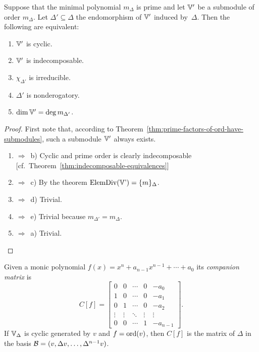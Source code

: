 \begin{cor}
    Suppose that the minimal polynomial\/ $m_\Delta$ is prime and let\/ $\mathbb V'$ be a submodule of order\/ $m_\Delta$. Let\/ $\Delta'\subseteq\Delta$ the endomorphism of\/ $\mathbb V'$ induced by\/~$\Delta$. Then the following are equivalent:
    \begin{enumerate}[\rm a)]
        \item $\mathbb V'$ is cyclic.  
        \item $\mathbb V'$ is indecomposable.  
        \item $\chi_{\Delta'}$ is irreducible.  
        \item $\Delta'$ is nonderogatory.
        \item $\dim\mathbb V' = \deg m_{\Delta'}$.
    \end{enumerate}
\end{cor}

\begin{proof}First note that, according to Theorem~\ref{thm:prime-factors-of-ord-have-submodules}, such a submodule $\mathbb V'$ always exists.
    \begin{enumerate}[\rm a)]
        \item $\Rightarrow$~b) Cyclic and prime order is clearly indecomposable [cf.~Theorem~\ref{thm:indecomposable-equivalences}]

        \item $\Rightarrow$~c) By the theorem $\operatorname{ElemDiv(\mathbb V')}=\{m\}_\Delta$.

        \item $\Rightarrow$~d) Trivial.

        \item $\Rightarrow$~e) Trivial because $m_{\Delta'}=m_\Delta$.

        \item $\Rightarrow$~a) Trivial.
    \end{enumerate}
\end{proof}

\begin{defn}\label{defn:companion-matrix}
    Given a monic polynomial $f(x)=x^n+a_{n-1}x^{n-1}+\cdots+a_0$ its \textsl{companion matrix} is
    $$
        C[f] = 
        \begin{bmatrix}
        0 & 0 & \cdots & 0 & -a_0 \\
        1 & 0 & \cdots & 0 & -a_1 \\
        0 & 1 & \cdots & 0 & -a_2 \\
        \vdots & \vdots & \ddots & \vdots & \vdots \\
        0 & 0 & \cdots & 1 & -a_{n-1}
        \end{bmatrix}.
    $$
    If $\mathbb V_\Delta$ is cyclic generated by $v$ and $f=\operatorname{ord}(v)$, then $C[f]$ is the matrix of $\Delta$ in the basis $\mathcal B=(v,\Delta v,\dots,\Delta^{n-1}v)$.
\end{defn}

